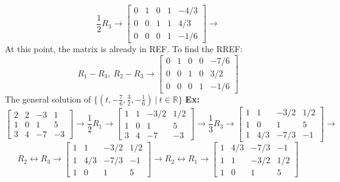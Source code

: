 \documentclass[]{article}
\begin{document}
\begin{enumerate}
			$$
				\frac{1}{2}R_3\rightarrow
				\left[
					\begin{array}{cccc|c}
						{0}&{1}&{0}&{1}&{-4/3}\\
						{0}&{0}&{1}&{1}&{4/3}\\
						{0}&{0}&{0}&{1}&{-1/6}
					\end{array}
				\right]\rightarrow
			$$
			At this point, the matrix is already in REF. To find the RREF:
			$$
				R_1-R_3,~R_2-R_3\rightarrow\left[
					\begin{array}{cccc|c}
						{0}&{1}&{0}&{0}&{-7/6}\\
						{0}&{0}&{1}&{0}&{3/2}\\
						{0}&{0}&{0}&{1}&{-1/6}
					\end{array}
				\right]
			$$
			The general solution of $\{ (t,-\frac{7}{6},\frac{3}{2},-\frac{1}{6})~|~t\in\mathbb{R} \}$
			{\bf Ex:}
			$$
				\left[
					\begin{array}{ccc|c}
						{2}&{2}&{-3}&{1}\\
						{1}&{0}&{1}&{5}\\
						{3}&{4}&{-7}&{-3}
					\end{array}
				\right]\rightarrow\frac{1}{2}R_1\rightarrow
				\left[
					\begin{array}{ccc|c}
						{1}&{1}&{-3/2}&{1/2}\\
						{1}&{0}&{1}&{5}\\
						{3}&{4}&{-7}&{-3}
					\end{array}
				\right]\rightarrow\frac{1}{3}R_3\rightarrow
				\left[
					\begin{array}{ccc|c}
						{1}&{1}&{-3/2}&{1/2}\\
						{1}&{0}&{1}&{5}\\
						{1}&{4/3}&{-7/3}&{-1}
					\end{array}
				\right]\rightarrow
			$$
			$$
				R_2\leftrightarrow R_3\rightarrow
				\left[
					\begin{array}{ccc|c}
						{1}&{1}&{-3/2}&{1/2}\\
						{1}&{4/3}&{-7/3}&{-1}\\
						{1}&{0}&{1}&{5}
					\end{array}
				\right]\rightarrow R_2\leftrightarrow R_1\rightarrow
				\left[
					\begin{array}{ccc|c}
						{1}&{4/3}&{-7/3}&{-1}\\
						{1}&{1}&{-3/2}&{1/2}\\
						{1}&{0}&{1}&{5}
					\end{array}
				\right]
			$$
		\end{enumerate}
\end{document}
